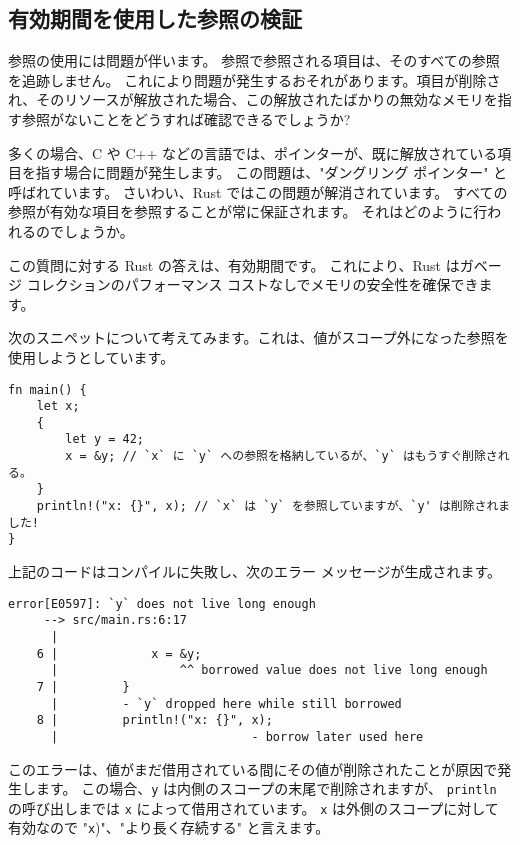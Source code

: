 \subsection{有効期間を使用した参照の検証}


参照の使用には問題が伴います。 参照で参照される項目は、そのすべての参照を追跡しません。 これにより問題が発生するおそれがあります。項目が削除され、そのリソースが解放された場合、この解放されたばかりの無効なメモリを指す参照がないことをどうすれば確認できるでしょうか?

多くの場合、C や C++ などの言語では、ポインターが、既に解放されている項目を指す場合に問題が発生します。 この問題は、"ダングリング ポインター" と呼ばれています。 さいわい、Rust ではこの問題が解消されています。 すべての参照が有効な項目を参照することが常に保証されます。 それはどのように行われるのでしょうか。

この質問に対する Rust の答えは、有効期間です。 これにより、Rust はガベージ コレクションのパフォーマンス コストなしでメモリの安全性を確保できます。

次のスニペットについて考えてみます。これは、値がスコープ外になった参照を使用しようとしています。


\begin{lstlisting}[numbers=none]
fn main() {
    let x;
    {
        let y = 42;
        x = &y; // `x` に `y` への参照を格納しているが、`y` はもうすぐ削除される。
    }
    println!("x: {}", x); // `x` は `y` を参照していますが、`y' は削除されました!
}
\end{lstlisting}

上記のコードはコンパイルに失敗し、次のエラー メッセージが生成されます。

\begin{lstlisting}[numbers=none]
    error[E0597]: `y` does not live long enough
     --> src/main.rs:6:17
      |
    6 |             x = &y;
      |                 ^^ borrowed value does not live long enough
    7 |         }
      |         - `y` dropped here while still borrowed
    8 |         println!("x: {}", x);
      |                           - borrow later used here
\end{lstlisting}

このエラーは、値がまだ借用されている間にその値が削除されたことが原因で発生します。 この場合、\texttt{y} は内側のスコープの末尾で削除されますが、 \texttt{println} の呼び出しまでは \texttt{x} によって借用されています。 \texttt{x} は外側のスコープに対して有効なので "\texttt{x})"、"より長く存続する" と言えます。

